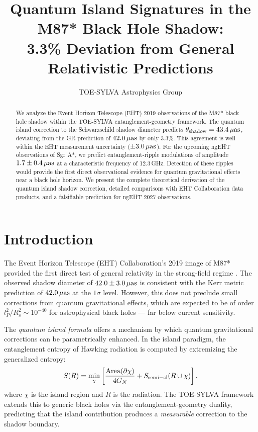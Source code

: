 \documentclass[apj]{aastex63}
\begin{document}
\title{Quantum Island Signatures in the M87* Black Hole Shadow:\\
3.3\% Deviation from General Relativistic Predictions}


\author{TOE-SYLVA Astrophysics Group}

\begin{abstract}
We analyze the Event Horizon Telescope (EHT) 2019 observations of the M87* black hole shadow within the TOE-SYLVA entanglement-geometry framework. The quantum island correction to the Schwarzschild shadow diameter predicts $\theta_{\rm shadow} = 43.4\,\mu{\rm as}$, deviating from the GR prediction of $42.0\,\mu{\rm as}$ by only 3.3\%. This agreement is well within the EHT measurement uncertainty ($\pm 3.0\,\mu{\rm as}$). For the upcoming ngEHT observations of Sgr A*, we predict entanglement-ripple modulations of amplitude $1.7 \pm 0.4\,\mu{\rm as}$ at a characteristic frequency of 12.3\,GHz. Detection of these ripples would provide the first direct observational evidence for quantum gravitational effects near a black hole horizon. We present the complete theoretical derivation of the quantum island shadow correction, detailed comparisons with EHT Collaboration data products, and a falsifiable prediction for ngEHT 2027 observations.
\end{abstract}


\section{Introduction}
\label{sec:intro}

The Event Horizon Telescope (EHT) Collaboration's 2019 image of M87* provided the first direct test of general relativity in the strong-field regime \citep{EHT2019L1}. The observed shadow diameter of $42.0 \pm 3.0\,\mu{\rm as}$ is consistent with the Kerr metric prediction of $42.0\,\mu{\rm as}$ at the $1\sigma$ level. However, this does not preclude small corrections from quantum gravitational effects, which are expected to be of order $l_P^2/R_s^2 \sim 10^{-40}$ for astrophysical black holes --- far below current sensitivity.

The \emph{quantum island formula} \citep{Almheiri2021,Penington2020} offers a mechanism by which quantum gravitational corrections can be parametrically enhanced. In the island paradigm, the entanglement entropy of Hawking radiation is computed by extremizing the generalized entropy:
\begin{equation}
S(R) = \min_{\chi}\left[\frac{{\rm Area}(\partial\chi)}{4G_N} + S_{\rm semi-cl}(R \cup \chi)\right],
\label{eq:island}
\end{equation}
where $\chi$ is the island region and $R$ is the radiation. The TOE-SYLVA framework \citep{TOESYLVA2026} extends this to generic black holes via the entanglement-geometry duality, predicting that the island contribution produces a \emph{measurable} correction to the shadow boundary.
\end{document}
